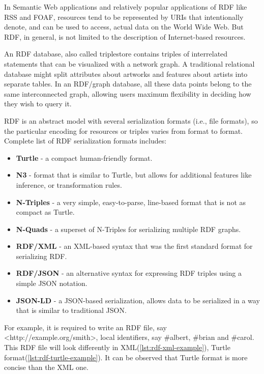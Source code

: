 \documentclass[thesis=M,english,hidelinks]{FITthesis}[2019/12/23]
\begin{document}
In Semantic Web applications and relatively popular applications of \gls{RDF} like \gls{RSS} and \gls{FOAF}, resources tend to be represented by URIs that intentionally denote, and can be used to access, actual data on the World Wide Web. But \gls{RDF}, in general, is not limited to the description of Internet-based resources.

An \gls{RDF} database, also called triplestore contains triples of  interrelated statements that can be visualized with a network graph. A traditional relational database might split attributes about artworks and features about artists into separate tables. In an RDF/graph database, all these data points belong to the same interconnected graph, allowing users maximum flexibility in deciding how they wish to query it.

\gls{RDF} is an abstract model with several serialization formats (i.e., file formats), so the particular encoding for resources or triples varies from format to format. Complete list of \gls{RDF} serialization formats includes:
\begin{itemize}
	\item \textbf{Turtle} - a compact human-friendly format.
	\item \textbf{N3} - format that is similar to Turtle, but allows for additional features like inference, or transformation rules.
	\item \textbf{N-Triples} - a very simple, easy-to-parse, line-based format that is not as compact as Turtle.
	\item \textbf{N-Quads} - a superset of N-Triples for serializing multiple \gls{RDF} graphs.
	\item \textbf{RDF/XML} - an XML-based syntax that was the first standard format for serializing RDF.
	\item \textbf{RDF/JSON} - an alternative syntax for expressing RDF triples using a simple JSON notation.
	\item \textbf{JSON-LD} - a JSON-based serialization, allows data to be serialized in a way that is similar to traditional JSON. 
\end{itemize}

For example, it is required to write an \gls{RDF} file,  say \textless http://example.org/smith\textgreater, local identifiers, say  \#albert, \#brian and \#carol.  This  \gls{RDF} file will look differently in \gls{XML}(\ref{lst:rdf-xml-example}), Turtle format(\ref{lst:rdf-turtle-example}). It can be observed that Turtle format is more concise than the \gls{XML} one.
\end{document}
